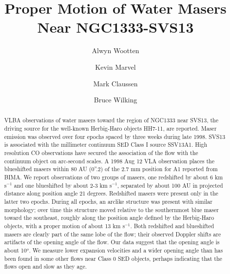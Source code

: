 %
%
\pagestyle{myheadings}
\nofiles

\setcounter{page}{1}

\title{Proper Motion of Water Masers Near NGC1333-SVS13}
\author{Alwyn Wootten }
\author{Kevin Marvel}
\author{Mark Claussen}
\author{Bruce Wilking}

\begin{abstract}
VLBA observations of water masers toward the region of NGC1333 near SVS13, 
the driving source for the well-known Herbig-Haro objects HH7-11, are reported. 
Maser emission was observed over four epochs spaced by three weeks during 
late 1998.   SVS13 is associated with the millimeter continuum SED Class I 
source SSV13A1.  High resolution CO observations have secured the association 
of the flow with the continuum object on arc-second scales.  A 1998 Aug 12 
VLA observation places the blueshifted masers within 80 AU (0''.2) of the 
2.7 mm position for A1 reported from BIMA.  We report observations of two 
groups of masers, one redshifted by about 6 km s$^{-1}$ and one blueshifted 
by about  2-3 km s$^{-1}$, separated by about 100 AU in projected distance 
along position angle 21 degrees.  Redshifted masers were present only in 
the latter two epochs.  During all epochs, an arclike structure was present 
with similar morphology; over time this structure moved relative to the 
southernmost blue maser toward the southeast, roughly along the position 
angle defined by the Herbig-Haro objects, with a proper motion of about 
13 km s$^{-1}$.  Both redshifted and blueshifted masers are clearly part 
of the same lobe of the flow; their observed Doppler shifts are artifacts 
of the opening angle of the flow.  Our data suggest that the opening angle 
is about 10$^o$.  We measure lower expansion velocities and a wider opening 
angle than has been found in some other flows near Class 0 SED objects, 
perhaps indicating that the flows open and slow as they age.


\end{abstract}

